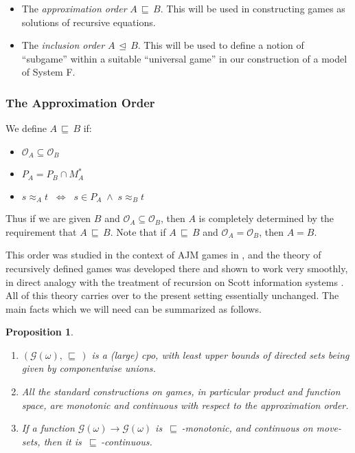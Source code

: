 \documentclass[a4paper,11pt]{article}
\newcommand{\gequiv}{\approx}
\newtheorem{proposition}{Proposition}[section]
\newcommand{\GG}[1]{\mathcal{G}(#1)}
\newcommand{\domapprox}{\, \sqsubseteq \,}
\newcommand{\ginc}{\, \trianglelefteq \,}
\newcommand{\Occ}{\mathcal{O}}
\begin{document}
\begin{itemize}
\item The \emph{approximation order} $A \domapprox B$. This will be
  used in constructing games as solutions of recursive equations.

\item The \emph{inclusion order} $A \ginc B$. This will be used to
  define a notion of ``subgame'' within a suitable ``universal game''
  in our construction of a model of System F.
\end{itemize}

\subsubsection{The Approximation Order}
We define $A \domapprox B$ if:
\begin{itemize}
\item $\Occ_A \subseteq \Occ_B$
\item $P_A = P_B \cap M_A^{\ast}$
\item $s \gequiv_A t \;\; \Longleftrightarrow \;\; s \in P_A \; \wedge \;
  s \gequiv_B t$
\end{itemize}
Thus if we are given $B$ and $\Occ_A \subseteq \Occ_B$, then $A$ is
completely determined by the requirement that $A \domapprox B$. Note
that if $A \domapprox B$ and $\Occ_A = \Occ_B$, then $A = B$.

This order was studied in the context of AJM games in \cite{AM95}, and the
theory of recursively defined games was developed there and shown to
work very smoothly, in direct analogy with the treatment of recursion
on Scott information systems \cite{Win93}. All of this theory carries over
to the present setting essentially unchanged. The main facts which we
will need can be summarized as follows.
\begin{proposition}
\label{domapprox}
\begin{enumerate}
\item $(\GG{\omega}, {\domapprox})$ is a (large) cpo, with least upper
  bounds of directed sets being given by componentwise unions.
\item All the standard constructions on games, in particular
  product and function space, are monotonic and continuous with
  respect to the approximation order.
\item If a function $\GG{\omega} \longrightarrow \GG{\omega}$ is
  $\domapprox$-monotonic, and continuous on move-sets, then it is
  $\domapprox$-continuous.
\end{enumerate}
\end{proposition}
\end{document}
